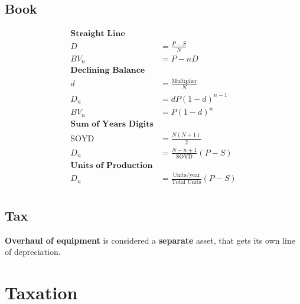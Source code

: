\documentclass[landscape, letterpaper, 10pt]{article}
\begin{document}
\begin{multicols}{3}
    \subsection*{Book}
    \begin{align*}
        \textbf{Straight Line}                                            \\
        D           & = \frac{P-S}{N}                                     \\
        BV_n        & = P-nD                                              \\
        \textbf {Declining Balance}                                       \\
        d           & = \frac{\text{Multiplier}}{N}                       \\
        D_n         & = dP(1-d)^{n-1}                                     \\
        BV_n        & = P(1-d)^n                                          \\
        \textbf {Sum of Years Digits}                                     \\
        \text{SOYD} & = \frac{N(N+1)}{2}                                  \\
        D_n         & = \frac{N-n+1}{\text{SOYD}}(P-S)                    \\
        \textbf{Units of Production}                                      \\
        D_n         & = \frac{\text{Units/year}}{\text{Total Units}}(P-S) \\
    \end{align*}
    \subsection*{Tax}
    \textbf{Overhaul of equipment} is considered a \textbf{separate} asset, that gets its own line of depreciation.
    \section*{Taxation}

\end{multicols}
\end{document}
